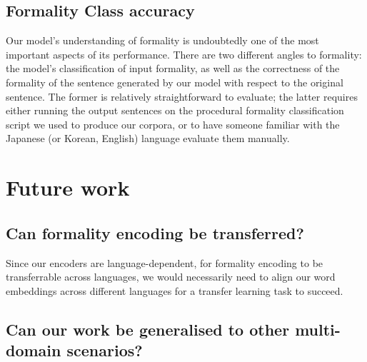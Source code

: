 \documentclass[11pt]{article}
\begin{document}
\subsection{Formality Class accuracy}

Our model's understanding of formality is undoubtedly one of the most important aspects of its performance. There are two different angles to formality: the model's classification of input formality, as well as the correctness of the formality of the sentence generated by our model with respect to the original sentence. The former is relatively straightforward to evaluate; the latter requires either running the output sentences on the procedural formality classification script we used to produce our corpora, or to have someone familiar with the Japanese (or Korean, English) language evaluate them manually.

\section{Future work}

\subsection{Can formality encoding be transferred?}

Since our encoders are language-dependent, for formality encoding to be transferrable across languages, we would necessarily need to align our word embeddings across different languages for a transfer learning task to succeed. 

\subsection{Can our work be generalised to other multi-domain scenarios?}



\newpage
\printbibliography
\end{document}
